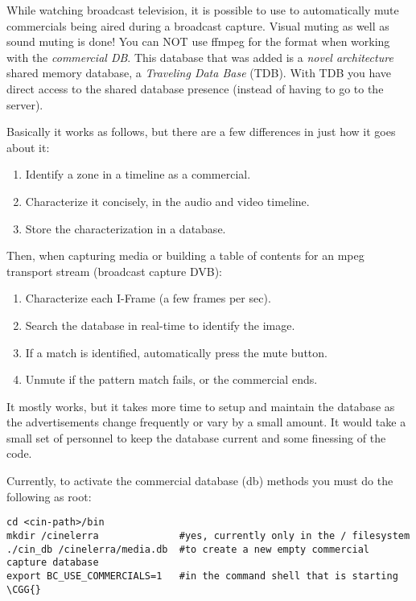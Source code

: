While watching broadcast television, it is possible to use \CGG{} to automatically mute commercials being aired during a broadcast capture.  Visual muting as well as sound muting is done!  You can NOT use ffmpeg for the format when working with the \textit{commercial DB}.  This database that was added is a \textit{novel architecture} shared memory database, a \textit{Traveling Data Base} (TDB). With TDB you have direct access to the shared database presence (instead of having to go to the server).

Basically it works as follows, but there are a few differences in just how it goes about it:

\begin{enumerate}
    \item Identify a zone in a timeline as a commercial.
    \item Characterize it concisely, in the audio and video timeline.
    \item Store the characterization in a database.
\end{enumerate}

Then, when capturing media or building a table of contents for an mpeg transport stream (broadcast capture DVB):

\begin{enumerate}
    \item Characterize each I-Frame (a few frames per sec).
    \item Search the database in real-time to identify the image.
    \item If a match is identified, automatically press the mute button.
    \item Unmute if the pattern match fails, or the commercial ends.
\end{enumerate}

It mostly works, but it takes more time to setup and maintain the database as the advertisements change frequently or vary by a small amount.  It would take a small set of personnel to keep the database current and some finessing of the code.

Currently, to activate the commercial database (db) methods you must do the following as root:

\begin{lstlisting}[style=sh]
cd <cin-path>/bin
mkdir /cinelerra              #yes, currently only in the / filesystem
./cin_db /cinelerra/media.db  #to create a new empty commercial     capture database
export BC_USE_COMMERCIALS=1   #in the command shell that is starting \CGG{}
\end{lstlisting}

